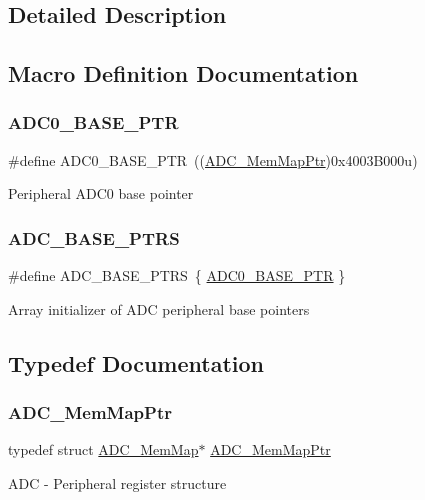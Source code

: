 \subsection{Detailed Description}


\subsection{Macro Definition Documentation}
\mbox{\label{group___a_d_c___peripheral_ga6cec2f227a3a37a9fccaa830740f1f5e}} 
\subsubsection{\texorpdfstring{A\+D\+C0\+\_\+\+B\+A\+S\+E\+\_\+\+P\+TR}{ADC0\_BASE\_PTR}}
{\footnotesize\ttfamily \#define A\+D\+C0\+\_\+\+B\+A\+S\+E\+\_\+\+P\+TR~((\hyperlink{group___a_d_c___peripheral_ga1673c677bf7c0ca339c8563e06de75fa}{A\+D\+C\+\_\+\+Mem\+Map\+Ptr})0x4003\+B000u)}

Peripheral A\+D\+C0 base pointer \mbox{\label{group___a_d_c___peripheral_gaaa8175a3a2f4efaceeed5bd26c0b2d3f}} 
\subsubsection{\texorpdfstring{A\+D\+C\+\_\+\+B\+A\+S\+E\+\_\+\+P\+T\+RS}{ADC\_BASE\_PTRS}}
{\footnotesize\ttfamily \#define A\+D\+C\+\_\+\+B\+A\+S\+E\+\_\+\+P\+T\+RS~\{ \hyperlink{group___a_d_c___peripheral_ga6cec2f227a3a37a9fccaa830740f1f5e}{A\+D\+C0\+\_\+\+B\+A\+S\+E\+\_\+\+P\+TR} \}}

Array initializer of A\+DC peripheral base pointers 

\subsection{Typedef Documentation}
\mbox{\label{group___a_d_c___peripheral_ga1673c677bf7c0ca339c8563e06de75fa}} 
\subsubsection{\texorpdfstring{A\+D\+C\+\_\+\+Mem\+Map\+Ptr}{ADC\_MemMapPtr}}
{\footnotesize\ttfamily typedef struct \hyperlink{struct_a_d_c___mem_map}{A\+D\+C\+\_\+\+Mem\+Map}$\ast$ \hyperlink{group___a_d_c___peripheral_ga1673c677bf7c0ca339c8563e06de75fa}{A\+D\+C\+\_\+\+Mem\+Map\+Ptr}}

A\+DC -\/ Peripheral register structure 